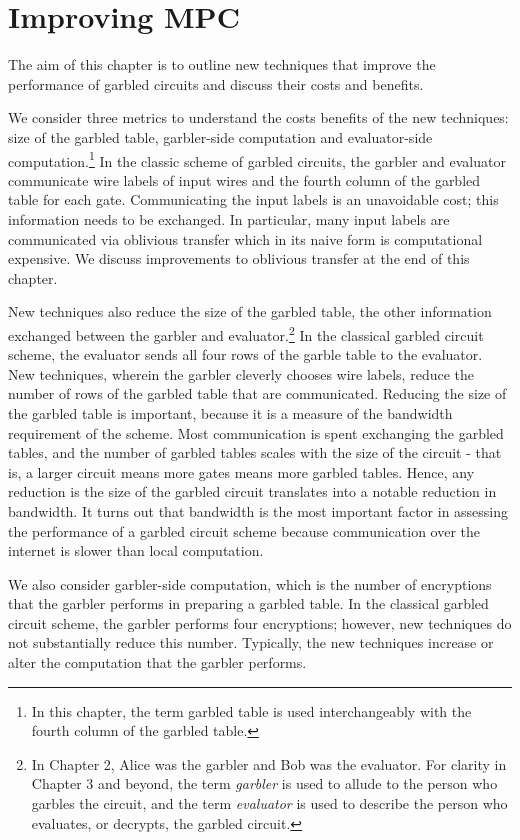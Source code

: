 
\chapter{Improving MPC}

The aim of this chapter is to outline new techniques that improve the performance of garbled circuits and discuss their costs and benefits.

We consider three metrics to understand the costs benefits of the new techniques: size of the garbled table, garbler-side computation and evaluator-side computation.\footnote{In this chapter, the term garbled table is used interchangeably with the fourth column of the garbled table.}
In the classic scheme of garbled circuits, the garbler and evaluator communicate wire labels of input wires and the fourth column of the garbled table for each gate.
Communicating the input labels is an unavoidable cost; this information needs to be exchanged. 
In particular, many input labels are communicated via oblivious transfer which in its naive form is computational expensive. 
We discuss improvements to oblivious transfer at the end of this chapter. 

New techniques also reduce the size of the garbled table, the other information exchanged between the garbler and evaluator.\footnote{In Chapter 2, Alice was the garbler and Bob was the evaluator. 
For clarity in Chapter 3 and beyond, the term \textit{garbler} is used to allude to the person who garbles the circuit, and the term \textit{evaluator} is used to describe the person who evaluates, or decrypts, the garbled circuit.}
In the classical garbled circuit scheme, the evaluator sends all four rows of the garble table to the evaluator.
New techniques, wherein the garbler cleverly chooses wire labels, reduce the number of rows of the garbled table that are communicated.
Reducing the size of the garbled table is important, because it is a measure of the bandwidth requirement of the scheme.
Most communication is spent exchanging the garbled tables, and the number of garbled tables scales with the size of the circuit - that is, a larger circuit means more gates means more garbled tables.
Hence, any reduction is the size of the garbled circuit translates into a notable reduction in bandwidth.
It turns out that bandwidth is the most important factor in assessing the performance of a garbled circuit scheme because communication over the internet is slower than local computation.

We also consider garbler-side computation, which is the number of encryptions that the garbler performs in preparing a garbled table.
In the classical garbled circuit scheme, the garbler performs four encryptions; however, new techniques do not substantially reduce this number.
Typically, the new techniques increase or alter the computation that the garbler performs.

